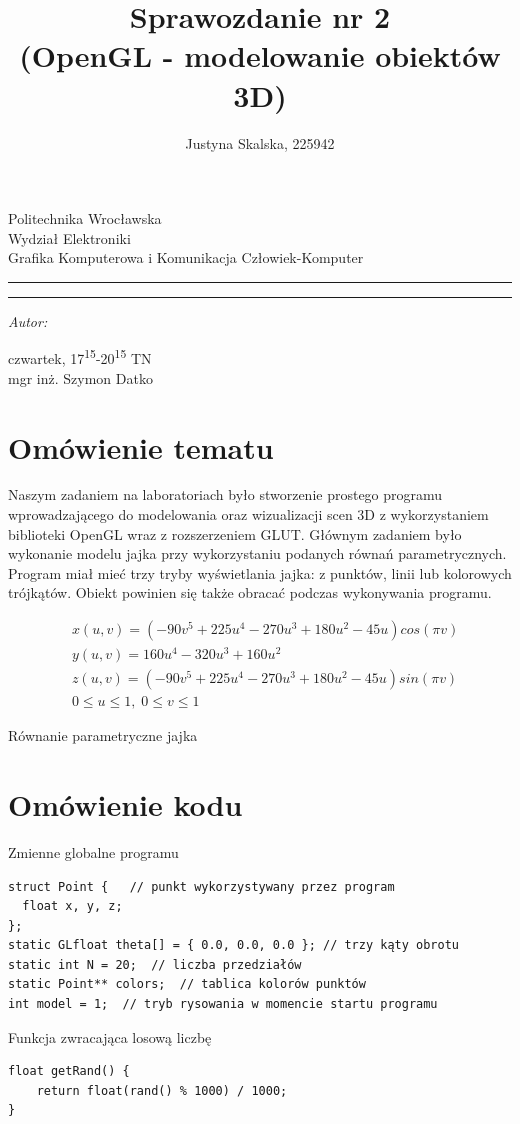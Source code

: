 \documentclass[12pt,a4paper,titlepage]{article}
\author{Justyna Skalska, 225942}
\title{Sprawozdanie nr 2\\
(OpenGL - modelowanie obiektów 3D)}
\makeatletter
\newcommand{\linia}{\rule{\linewidth}{0.4mm}}
\renewcommand{\maketitle}{\begin{titlepage}
    \vspace*{1cm}
    \begin{center}\small
    Politechnika Wrocławska\\
    Wydział Elektroniki\\
    Grafika Komputerowa i Komunikacja Człowiek-Komputer
    \end{center}
    \vspace{3cm}
    \noindent\linia
    \begin{center}
      \LARGE \textsc{\@title}
         \end{center}
     \linia
    \vspace{0.5cm}
    \begin{flushright}
    \begin{minipage}{7cm}
    \textit{\small Autor:}\\
    \normalsize \textsc{\@author} \par
    \end{minipage}
    \vspace{5cm}

     {\small czwartek, 17\textsuperscript{15}-20\textsuperscript{15} TN}\\
        mgr inż. Szymon Datko
     \end{flushright}
    \vspace*{\stretch{6}}
    \begin{center}
    \@date
    \end{center}
  \end{titlepage}%
}
\makeatother
\begin{document}
\maketitle
\section{Omówienie tematu}
Naszym zadaniem na laboratoriach było stworzenie prostego programu wprowadzającego do modelowania oraz wizualizacji scen 3D z wykorzystaniem biblioteki OpenGL wraz z rozszerzeniem GLUT. Głównym zadaniem było wykonanie modelu jajka przy wykorzystaniu podanych równań parametrycznych. Program miał mieć trzy tryby wyświetlania jajka: z punktów, linii lub kolorowych trójkątów. Obiekt powinien się także obracać podczas wykonywania programu.

\begin{myequation}[H]
\begin{equation}
    \begin{split}
    &x(u,v) = (-90v^5 + 225u^4 -270u^3 + 180u^2 - 45u)cos(\pi v) \\
    &y(u,v) = 160u^4 - 320u^3 + 160u^2 \\
    &z(u,v) = (-90v^5 + 225u^4 -270u^3 + 180u^2 - 45u)sin(\pi v) \\
    &0 \le u \le 1, \; 0 \le v \le 1
    \end{split}
\end{equation}
\caption{Równanie parametryczne jajka}
\end{myequation}

\section{Omówienie kodu}

\begin{listing}[H]
\caption{Zmienne globalne programu}
\begin{verbatim}
struct Point {   // punkt wykorzystywany przez program
  float x, y, z;
};
static GLfloat theta[] = { 0.0, 0.0, 0.0 }; // trzy kąty obrotu
static int N = 20;  // liczba przedziałów
static Point** colors;  // tablica kolorów punktów
int model = 1;  // tryb rysowania w momencie startu programu
\end{verbatim}
\end{listing}

\begin{listing}[H]
\caption{Funkcja zwracająca losową liczbę}
\begin{verbatim}
float getRand() {
    return float(rand() % 1000) / 1000;
}
\end{verbatim}
\end{listing}
\end{document}
